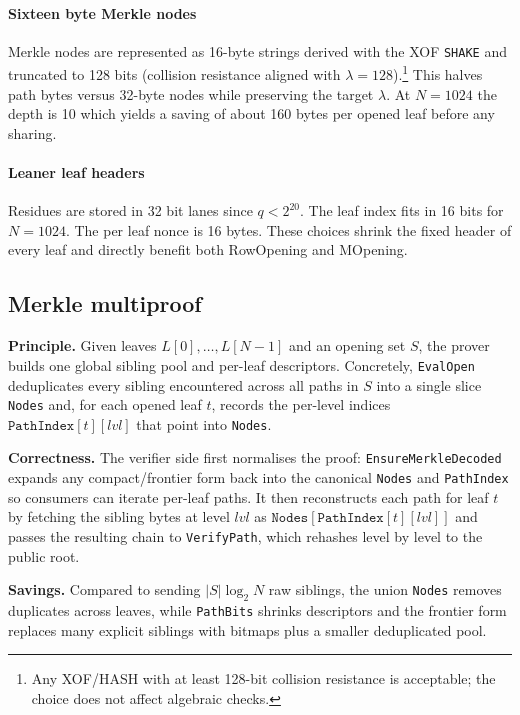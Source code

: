 \paragraph{Sixteen byte Merkle nodes}
Merkle nodes are represented as 16-byte strings derived with the XOF \texttt{SHAKE} and truncated to 128 bits (collision resistance aligned with $\lambda{=}128$).\footnote{Any XOF/HASH with at least 128-bit collision resistance is acceptable; the choice does not affect algebraic checks.}
This halves path bytes versus 32-byte nodes while preserving the target $\lambda$.
At \(N=1024\) the depth is 10 which yields a saving of about 160 bytes per opened leaf before any sharing.

\paragraph{Leaner leaf headers}
Residues are stored in 32 bit lanes since \(q<2^{20}\). The leaf index fits in 16 bits for \(N=1024\). The per leaf nonce is 16 bytes. These choices shrink the fixed header of every leaf and directly benefit both RowOpening and MOpening.

\subsection*{Merkle multiproof}

\textbf{Principle.} Given leaves \(L[0],\ldots,L[N-1]\) and an opening set \(S\), the prover builds one global sibling pool and per-leaf descriptors. Concretely, \texttt{EvalOpen} deduplicates every sibling encountered across all paths in \(S\) into a single slice \texttt{Nodes} and, for each opened leaf \(t\), records the per-level indices \(\texttt{PathIndex}[t][\textit{lvl}]\) that point into \texttt{Nodes}. 


\textbf{Correctness.} The verifier side first normalises the proof: \texttt{EnsureMerkleDecoded} expands any compact/frontier form back into the canonical \texttt{Nodes} and \texttt{PathIndex} so consumers can iterate per-leaf paths. It then reconstructs each path for leaf \(t\) by fetching the sibling bytes at level \(\textit{lvl}\) as \(\texttt{Nodes}[\texttt{PathIndex}[t][\textit{lvl}]]\) and passes the resulting chain to \texttt{VerifyPath}, which rehashes level by level to the public root.


\textbf{Savings.} Compared to sending \(|S|\log_2 N\) raw siblings, the union \texttt{Nodes} removes duplicates across leaves, while \texttt{PathBits} shrinks descriptors and the frontier form replaces many explicit siblings with bitmaps plus a smaller deduplicated pool.


